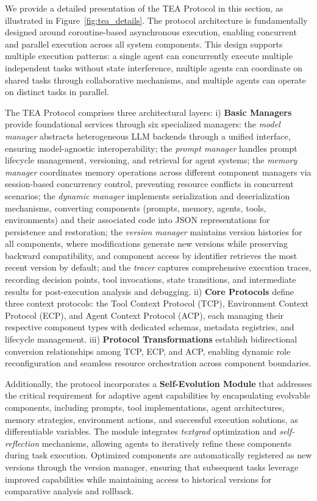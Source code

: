 \documentclass[11pt]{article}
\begin{document}
We provide a detailed presentation of the TEA Protocol in this section, as illustrated in Figure~\ref{fig:tea_details}. The protocol architecture is fundamentally designed around coroutine-based asynchronous execution, enabling concurrent and parallel execution across all system components. This design supports multiple execution patterns: a single agent can concurrently execute multiple independent tasks without state interference, multiple agents can coordinate on shared tasks through collaborative mechanisms, and multiple agents can operate on distinct tasks in parallel. 

The TEA Protocol comprises three architectural layers: i) \textbf{Basic Managers} provide foundational services through six specialized managers: the \textit{model manager} abstracts heterogeneous LLM backends through a unified interface, ensuring model-agnostic interoperability; the \textit{prompt manager} handles prompt lifecycle management, versioning, and retrieval for agent systems; the \textit{memory manager} coordinates memory operations across different component managers via session-based concurrency control, preventing resource conflicts in concurrent scenarios; the \textit{dynamic manager} implements serialization and deserialization mechanisms, converting components (prompts, memory, agents, tools, environments) and their associated code into JSON representations for persistence and restoration; the \textit{version manager} maintains version histories for all components, where modifications generate new versions while preserving backward compatibility, and component access by identifier retrieves the most recent version by default; and the \textit{tracer} captures comprehensive execution traces, recording decision points, tool invocations, state transitions, and intermediate results for post-execution analysis and debugging. ii) \textbf{Core Protocols} define three context protocols: the Tool Context Protocol (TCP), Environment Context Protocol (ECP), and Agent Context Protocol (ACP), each managing their respective component types with dedicated schemas, metadata registries, and lifecycle management. iii) \textbf{Protocol Transformations} establish bidirectional conversion relationships among TCP, ECP, and ACP, enabling dynamic role reconfiguration and seamless resource orchestration across component boundaries.

Additionally, the protocol incorporates a \textbf{Self-Evolution Module} that addresses the critical requirement for adaptive agent capabilities by encapsulating evolvable components, including prompts, tool implementations, agent architectures, memory strategies, environment actions, and successful execution solutions, as differentiable variables. The module integrates \textit{textgrad} optimization and \textit{self-reflection} mechanisms, allowing agents to iteratively refine these components during task execution. Optimized components are automatically registered as new versions through the version manager, ensuring that subsequent tasks leverage improved capabilities while maintaining access to historical versions for comparative analysis and rollback.
\end{document}
